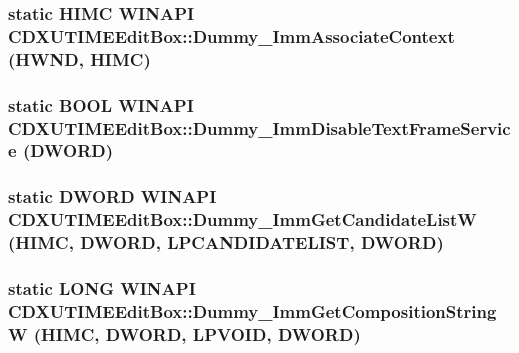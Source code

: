 \label{class_c_d_x_u_t_i_m_e_edit_box_a54618d363797a91b5e1f42da21f66c82}
\hypertarget{class_c_d_x_u_t_i_m_e_edit_box_a30b830faa43dc64e1d1131aa57c36bce}{
\subsubsection[{Dummy\_\-ImmAssociateContext}]{\setlength{\rightskip}{0pt plus 5cm}static {\bf HIMC} WINAPI CDXUTIMEEditBox::Dummy\_\-ImmAssociateContext (HWND, \/  {\bf HIMC})}}
\label{class_c_d_x_u_t_i_m_e_edit_box_a30b830faa43dc64e1d1131aa57c36bce}
\hypertarget{class_c_d_x_u_t_i_m_e_edit_box_af417993379722080b7adbeaaef621d87}{
\subsubsection[{Dummy\_\-ImmDisableTextFrameService}]{\setlength{\rightskip}{0pt plus 5cm}static {\bf BOOL} WINAPI CDXUTIMEEditBox::Dummy\_\-ImmDisableTextFrameService ({\bf DWORD})}}
\label{class_c_d_x_u_t_i_m_e_edit_box_af417993379722080b7adbeaaef621d87}
\hypertarget{class_c_d_x_u_t_i_m_e_edit_box_a76d4496d2c82e04f87b79a162c08de37}{
\subsubsection[{Dummy\_\-ImmGetCandidateListW}]{\setlength{\rightskip}{0pt plus 5cm}static {\bf DWORD} WINAPI CDXUTIMEEditBox::Dummy\_\-ImmGetCandidateListW ({\bf HIMC}, \/  {\bf DWORD}, \/  {\bf LPCANDIDATELIST}, \/  {\bf DWORD})}}
\label{class_c_d_x_u_t_i_m_e_edit_box_a76d4496d2c82e04f87b79a162c08de37}
\hypertarget{class_c_d_x_u_t_i_m_e_edit_box_a45677be982c66ec3db85f619ebab910b}{
\subsubsection[{Dummy\_\-ImmGetCompositionStringW}]{\setlength{\rightskip}{0pt plus 5cm}static LONG WINAPI CDXUTIMEEditBox::Dummy\_\-ImmGetCompositionStringW ({\bf HIMC}, \/  {\bf DWORD}, \/  {\bf LPVOID}, \/  {\bf DWORD})}}
